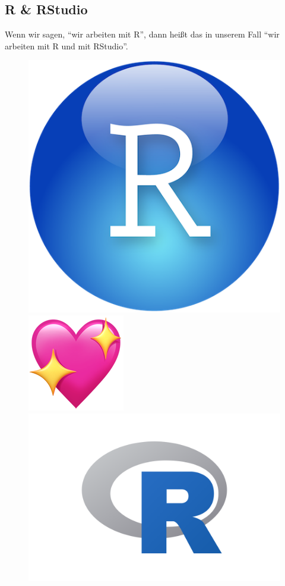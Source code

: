 \documentclass[
  letterpaper,
]{scrbook}
\theoremstyle{definition}
\theoremstyle{definition}
\theoremstyle{definition}
\theoremstyle{remark}
\begin{document}
\subsection{R \& RStudio}\label{r-rstudio}

Wenn wir sagen, ``wir arbeiten mit R'', dann heißt das in unserem Fall
``wir arbeiten mit R und mit RStudio''.

\begin{figure}

\begin{minipage}{0.40\linewidth}

\includegraphics[width=0.4\linewidth,height=\textheight,keepaspectratio]{img/rstudio-logo-small.png}

\end{minipage}%
%
\begin{minipage}{0.20\linewidth}

\includegraphics[width=0.4\linewidth,height=\textheight,keepaspectratio]{img/sparkling_heart.png}

\end{minipage}%
%
\begin{minipage}{0.40\linewidth}

\includegraphics[width=0.7\linewidth,height=\textheight,keepaspectratio]{img/rlogo.png}


\end{minipage}
\end{figure}
\end{document}
